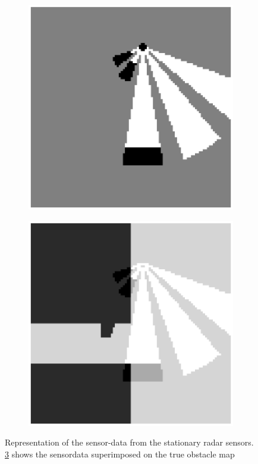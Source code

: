\begin{figure}[!t]
\begin{subfigure}[b]{0.48\linewidth}
    \centering
    \includegraphics[width= 1.2\linewidth]{Figures/radar_data.eps}
    \caption{}
    \label{fig:SensorData}
\end{subfigure}
\begin{subfigure}[b]{0.48\linewidth}
    \centering
    \includegraphics[width= 1.2\linewidth]{Figures/radar_data_superimposed.eps}
    \caption{}
    \label{fig:SuperimposedSensorData}
\end{subfigure}
\caption{Representation of the sensor-data from the stationary radar sensors. \ref{fig:SuperimposedSensorData} shows the sensordata superimposed on the true obstacle map }
\end{figure}


